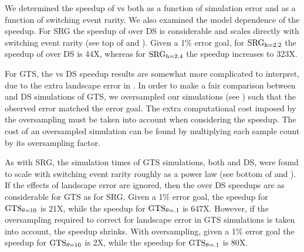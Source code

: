We determined the speedup of  vs  both as a function of simulation error and as a function of switching event rarity. We also examined the model dependence of the speedup. For SRG the speedup of  over DS is considerable and scales directly with switching event rarity (see top of  and ). Given a 1\% error goal, for $\text{SRG}_\text{h=2.2}$ the speedup of  over DS is 44X, whereas for $\text{SRG}_\text{h=2.4}$ the speedup increases to 323X.

For GTS, the  vs DS speedup results are somewhat more complicated to interpret, due to the extra landscape error in . In order to make a fair comparison between  and DS simulations of GTS, we oversampled our  simulations (see ) such that the observed error matched the error goal. The extra computational cost imposed by the oversampling must be taken into account when considering the speedup. The cost of an oversampled  simulation can be found by multiplying each sample count by its oversampling factor.
    
As with SRG, the simulation times of GTS simulations, both  and DS, were found to scale with switching event rarity roughly as a power law (see bottom of  and ). If the effects of landscape error are ignored, then the  over DS speedups are as considerable for GTS as for SRG. Given a 1\% error goal, the speedup for $\text{GTS}_{\theta=10}$ is 21X, while the speedup for $\text{GTS}_{\theta=.1}$ is 647X. However, if the oversampling required to correct for landscape error in GTS simulations is taken into account, the  speedup shrinks. With oversampling, given a 1\% error goal the speedup for $\text{GTS}_{\theta=10}$ is 2X, while the speedup for $\text{GTS}_{\theta=.1}$ is 80X.


